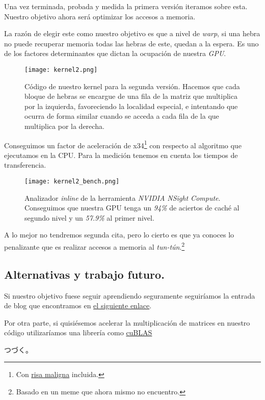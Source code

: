 Una vez terminada, probada y medida la primera versión iteramos sobre esta. Nuestro objetivo ahora será optimizar los
accesos a memoria.

La razón de elegir este como nuestro objetivo es que a nivel de \textit{warp}, si una hebra no puede recuperar memoria
todas las hebras de este, quedan a la espera. Es uno de los factores determinantes que dictan la ocupación de nuestra \textit{GPU}.

\begin{figure}[H]
    \centering
    \texttt{[image: kernel2.png]}
    \caption{Código de nuestro kernel para la segunda versión. Hacemos que cada bloque de hebras se encargue de una fila
    de la matriz que multiplica por la izquierda, favoreciendo la localidad especial, e intentando que ocurra de forma
    similar cuando se acceda a cada fila de la que multiplica por la derecha.}
\end{figure}

Conseguimos un factor de aceleración de x34\footnote{Con \href{https://www.youtube.com/watch?v=uC9d34cU2s8&t=73s}{risa maligna} incluida.} con respecto al algoritmo que ejecutamos en la CPU.
Para la medición tenemos en cuenta los tiempos de transferencia.

\begin{figure}[H]
    \centering
    \texttt{[image: kernel2\_bench.png]}
    \caption{Analizador \textit{inline} de la herramienta \textit{NVIDIA NSight Compute}. Conseguimos que nuestra GPU tenga un \textit{94\%} de aciertos de caché al segundo
    nivel y un \textit{57.9\%} al primer nivel.}
\end{figure}

A lo mejor no tendremos segunda cita, pero lo cierto es que ya conoces lo penalizante que es realizar
accesos a memoria al \textit{tun-tún}.\footnote{Basado en un meme que ahora mismo no encuentro.}

\subsection{Alternativas y trabajo futuro.}

Si nuestro objetivo fuese seguir aprendiendo seguramente seguiríamos la entrada de blog que encontramos en \href{https://siboehm.com/articles/22/CUDA-MMM}{el siguiente enlace}.

Por otra parte, si quisiésemos acelerar la multiplicación de matrices en nuestro código utilizaríamos una librería como \href{https://docs.nvidia.com/cuda/cublas/}{cuBLAS}

\begin{CJK}{UTF8}{min}
つづく。
\end{CJK}
